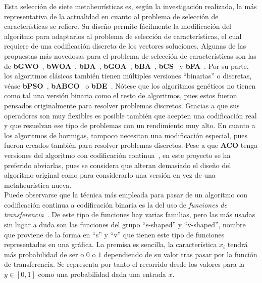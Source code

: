 Esta selección de siete metaheurísticas es, según la investigación realizada, la más representativa de la actualidad en cuanto al problema de selección de características se refiere. Su diseño permite fácilmente la modificación del algoritmo para adaptarlos al problema de selección de características, el cual requiere de una codificación discreta de los vectores soluciones. Algunas de las propuestas más novedosas para el problema de selección de características son las de \textbf{bGWO}~\cite{emary_binary_2016}, \textbf{bWOA}~\cite{hussien_s-shaped_2019, mafarja_whale_2018}, \textbf{bDA}~\cite{mafarja_binary_2018}, \textbf{bGOA}~\cite{mafarja_binary_2019}, \textbf{bBA}~\cite{mirjalili_binary_2014}, \textbf{bCS}~\cite{rodrigues_bcs_2013} y \textbf{bFA}~\cite{zhang_return-cost-based_2017}. Por su parte, los algoritmos clásicos también tienen múltiples versiones ``binarias'' o discretas, véase \textbf{bPSO}~\cite{mirjalili_s-shaped_2013}, \textbf{bABCO}~\cite{kiran_binary_2021} o \textbf{bDE}~\cite{pampara_binary_2006}. Nótese que los algoritmos genéticos no tienen como tal una versión binaria como el resto de algoritmos, pues estos fueron pensados originalmente para resolver problemas discretos. Gracias a que sus operadores son muy flexibles es posible también que acepten una codificación real y que resuelvan ese tipo de problemas con un rendimiento muy alto. En cuanto a los algoritmos de hormigas, tampoco necesitan una modificación especial, pues fueron creados también para resolver problemas discretos. Pese a que \textbf{ACO} tenga versiones del algoritmo con codificación continua~\cite{socha_aco_2004}, en este proyecto se ha preferido obviarlas, pues se considera que alteran demasiado el diseño del algoritmo original como para considerarlo una versión en vez de una metaheurística nueva.\\[6pt]
Puede observarse que la técnica más empleada para pasar de un algoritmo con codificación continua a codificación binaria es la del uso de \textit{funciones de transferencia}~\cite{he_novel_2022, mirjalili_s-shaped_2013, dokeroglu_comprehensive_2022}. De este tipo de funciones hay varias familias, pero las más usadas sin lugar a duda son las funciones del grupo ``s-shaped'' y ``v-shaped'', nombre que proviene de la forma en ``s'' y ``v'' que tienen este tipo de funciones representadas en una gráfica. La premisa es sencilla, la característica $x_i$ tendrá más probabilidad de ser o $0$ o $1$ dependiendo de su valor tras pasar por la función de transferencia. Se representa por tanto el recorrido desde los valores para la $y\in[0,1]$ como una probabilidad dada una entrada $x$.


